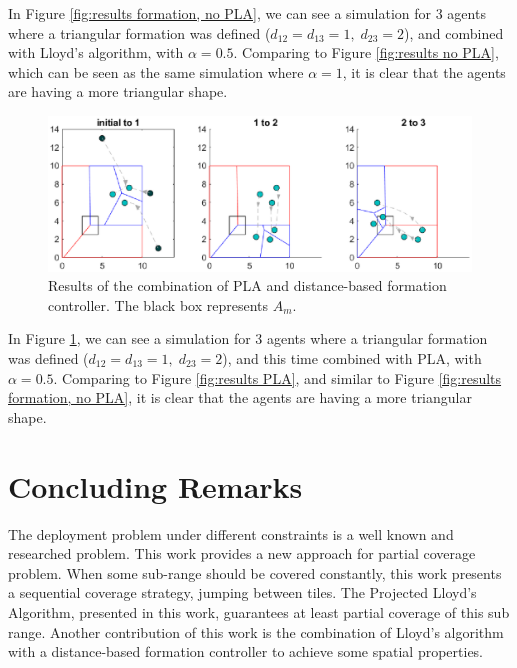 \documentclass{iacas}
\begin{document}
In Figure \ref{fig:results formation, no PLA}, we can see a simulation for 3 agents where a triangular formation was defined ($d_{12} = d_{13} = 1,\; d_{23} = 2$), and combined with Lloyd's algorithm, with $\alpha = 0.5$. Comparing to Figure \ref{fig:results no PLA}, which can be seen as the same simulation where $\alpha = 1$, it is clear that the agents are having a more triangular shape.

\begin{figure}[H]
\includegraphics[scale=0.8]{figures/proposed-sol/results/sim4-3agents-3partitions-PLA-formation.eps}
\caption{Results of the combination of PLA and distance-based formation controller. The black box represents $A_m$.}
\label{fig:results formation, PLA}
\end{figure}

In Figure \ref{fig:results formation, PLA}, we can see a simulation for 3 agents where a triangular formation was defined ($d_{12} = d_{13} = 1,\; d_{23} = 2$), and this time combined with PLA, with $\alpha = 0.5$. Comparing to Figure \ref{fig:results PLA}, and similar to Figure \ref{fig:results formation, no PLA}, it is clear that the agents are having a more triangular shape.


\section{Concluding Remarks}
The deployment problem under different constraints is a well known and researched problem. This work provides a new approach for partial coverage problem. When some sub-range should be covered constantly, this work presents a sequential coverage strategy, jumping between tiles. The Projected Lloyd's Algorithm, presented in this work, guarantees at least partial coverage of this sub range. Another contribution of this work is the combination of Lloyd's algorithm with a distance-based formation controller to achieve some spatial properties.
\end{document}
